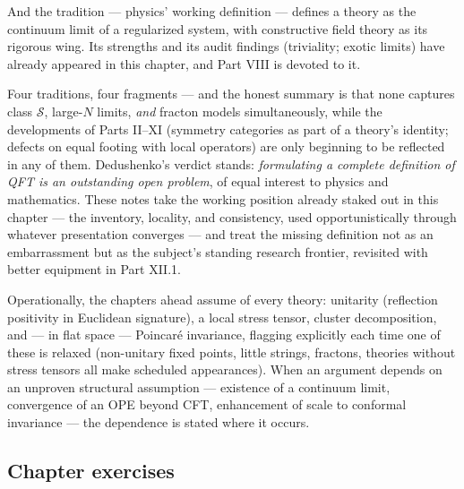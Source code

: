 And the  tradition --- physics' working definition --- defines a
theory as the continuum limit of a regularized system, with constructive field
theory as its rigorous wing. Its strengths and its audit findings (triviality;
exotic limits) have already appeared in this chapter, and Part VIII is devoted
to it.

\medskip

\noin Four traditions, four fragments --- and the honest summary is that none
captures class $\mathcal{S}$, large-$N$ limits, \emph{and} fracton models
simultaneously, while the developments of Parts II--XI (symmetry
categories as part of a theory's identity; defects on equal footing with
local operators) are only beginning to be reflected in any of them.
Dedushenko's verdict stands: \emph{formulating a complete definition of
QFT is an outstanding open problem}, of equal interest to physics and
mathematics. These notes take the working position already staked out in
this chapter --- the inventory, locality, and consistency, used
opportunistically through whatever presentation converges --- and treat
the missing definition not as an embarrassment but as the subject's
standing research frontier, revisited with better equipment in Part XII.1.

\begin{nnote}
Operationally, the chapters ahead assume of every theory: unitarity (reflection
positivity in Euclidean signature), a local stress tensor, cluster
decomposition, and --- in flat space --- Poincar\'e invariance, flagging
explicitly each time one of these is relaxed (non-unitary fixed points, little
strings, fractons, theories without stress tensors all make scheduled
appearances). When an argument depends on an unproven structural assumption ---
existence of a continuum limit, convergence of an OPE beyond CFT, enhancement of
scale to conformal invariance --- the dependence is stated where it occurs.
\end{nnote}

\subsection*{Chapter exercises}

